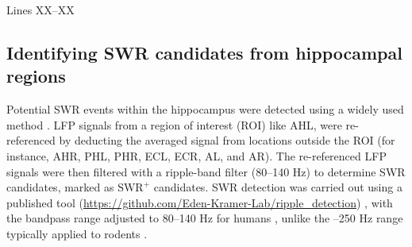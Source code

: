 {
\color{revision_color}
\revEditor{}
Lines XX--XX\\

\subsection{Identifying SWR candidates from hippocampal regions}
Potential SWR events within the hippocampus were detected using a widely used method \cite{liu_consensus_2022}. LFP signals from a region of interest (ROI) like AHL, were re-referenced by deducting the averaged signal from locations outside the ROI (for instance, AHR, PHL, PHR, ECL, ECR, AL, and AR). The re-referenced LFP signals were then filtered with a ripple-band filter (80--140 Hz) to determine SWR candidates, marked as $\textrm{SWR}^+$ candidates. SWR detection was carried out using a published tool (\url{https://github.com/Eden-Kramer-Lab/ripple_detection}) \cite{kay_hippocampal_2016}, with the bandpass range adjusted to 80--140 Hz for humans \DIFdelbegin {}\DIFdelend \DIFaddbegin {}\DIFaddend , unlike the \DIFdelbegin {}\DIFdelend \DIFaddbegin {}--250 Hz range typically applied to rodents \DIFaddbegin {}\DIFaddend .
}



